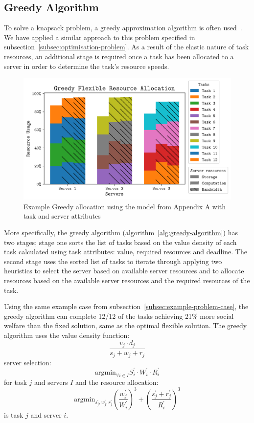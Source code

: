 \subsection{Greedy Algorithm}
\label{subsec:greedy-algorithm}
To solve a knapsack problem, a greedy approximation algorithm is often used~\cite{sahni1975approximate}. We have
applied a similar approach to this problem specified in subsection~\ref{subsec:optimisation-problem}. As a result of
the elastic nature of task resources, an additional stage is required once a task has been allocated to a server in
order to determine the task's resource speeds.

\begin{figure}
    \centering
    \includegraphics[width=\linewidth]{figs/allocation/greedy_flexible_resource_allocation.png}
    \caption{Example Greedy allocation using the model from Appendix A
             with task and server attributes}
    \label{fig:example-greedy-allocation}
\end{figure}

More specifically, the greedy algorithm (algorithm~\ref{alg:greedy-algorithm}) has two stages; stage one sorts the list
of tasks based on the value density of each task calculated using task attributes: value, required resources and
deadline. The second stage uses the sorted list of tasks to iterate through applying two heuristics to select the
server based on available server resources and to allocate resources based on the available server resources and the
required resources of the task.

Using the same example case from subsection~\ref{subsec:example-problem-case}, the greedy algorithm can complete 12/12 of
the tasks achieving 21\% more social welfare than the fixed solution, same as the optimal flexible solution.
The greedy algorithm uses the value density function:
\[\frac{v_j \cdot d_j}{s_j + w_j + r_j}\] server selection:
 \[\text{argmin}_{\forall i \in I} S^{'}_i \cdot W^{'}_i \cdot R^{'}_i\] for task $j$ and servers $I$ and the resource allocation:
\[\text{argmin}_{s^{'}_j, w^{'}_j, r^{'}_j} \left(\frac{w^{'}_j}{W^{'}_i}\right)^3 + \left(\frac{s^{'}_j + r^{'}_j}{R^{'}_i}\right)^3\]
is task $j$ and server $i$.

